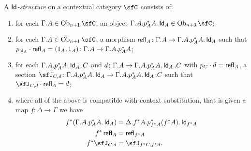 \begin{defn}
  A \emph{$\operatorname{\mathsf{Id}}$-structure} on a contextual category $\sfC$ consists of:
  \begin{enumerate}
    \item for each $\Gamma.A\in\Ob_{n+1}\sfC$, an object
      $\Gamma.A.p^*_AA.\Ids_A\in\Ob_{n+3}\sfC$;
    \item for each $\Gamma.A\in\Ob_{n+1}\sfC$, a morphism
      $\operatorname{\mathsf{refl}}_A\colon\Gamma.A\rightarrow\Gamma.A.p^*_AA.\operatorname{\mathsf{Id}}_A$ such that
      $p_{\operatorname{\mathsf{Id}}_A}\cdot\operatorname{\mathsf{refl}}_A=(1_A,1_A)\colon\Gamma.A\rightarrow\Gamma.A.p^*_AA$;
    \item for each $\Gamma.A.p^*_AA.\operatorname{\mathsf{Id}}_A.C$ and
      $d\colon\Gamma.A\rightarrow\Gamma.A.p^*_AA.\operatorname{\mathsf{Id}}_A.C$ with $p_C\cdot
      d=\operatorname{\mathsf{refl}}_A$, a section
      $\sfJ_{C,d}\colon\Gamma.A.p^*_AA.\Ids_A\rightarrow\Gamma.A.p^*_AA.\Ids_A.C$
      such that $\sfJ_{C,d}\cdot\refl_A=d$;
    \item where all of the above is compatible with context substitution, that
      is given a map $f\colon\Delta\rightarrow\Gamma$ we have
      \begin{align*}
        f^*(\Gamma.A.p^*_AA.\Ids_A) &=\Delta.f^*A.p^*_{f^*A}(f^*A).\Ids_{f^*A} \\
        f^*\refl_A &=\refl_{f^*A} \\
        f^*\sfJ_{C,d} &=\sfJ_{f^*C,f^*d}.
      \end{align*}
  \end{enumerate}
\end{defn}

